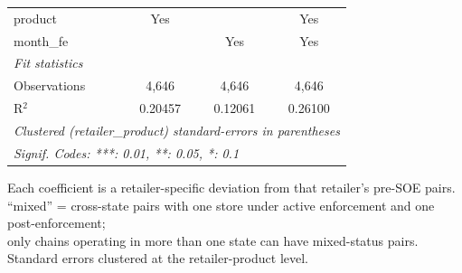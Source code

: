 \begin{table}[htbp]
\begin{tabular}{lccc}
      product                         & Yes            &               & Yes\\  
      month\_fe                       &                & Yes           & Yes\\  
      \midrule
      \emph{Fit statistics}\\
      Observations                    & 4,646          & 4,646         & 4,646\\  
      R$^2$                           & 0.20457        & 0.12061       & 0.26100\\  
      \midrule \midrule
      \multicolumn{4}{l}{\emph{Clustered (retailer\_product) standard-errors in parentheses}}\\
      \multicolumn{4}{l}{\emph{Signif. Codes: ***: 0.01, **: 0.05, *: 0.1}}\\
   \end{tabular}
   
   \par \raggedright 
   Each coefficient is a retailer-specific deviation from that retailer's pre-SOE pairs.\\
   ``mixed'' = cross-state pairs with one store under active enforcement and one post-enforcement;\\
   only chains operating in more than one state can have mixed-status pairs.\\
   Standard errors clustered at the retailer-product level.
\end{table}


